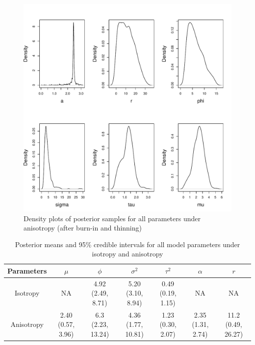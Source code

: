 \documentclass[12pt,twoside]{dukestatscithesis}
\theoremstyle{definition}
\theoremstyle{definition}
\theoremstyle{definition}
\theoremstyle{remark}
\begin{document}
\begin{figure}
\includegraphics[scale=0.7]{figure/density} \caption{Density plots of posterior samples for all parameters under anisotropy (after burn-in and thinning)}\label{fig:density}
\end{figure}
\begin{table}[H]
\centering
\setlength{\extrarowheight}{15pt}
\hspace*{-1.2cm}
\begin{tabular}{|c|c|c|c|c|c|c|}
\hline
Parameters & $\mu$ & $\phi$ & $\sigma^2$ & $\tau^2$ & $\alpha$ & $r$ \\[10pt]
\hline
Isotropy & NA & \pbox{20cm}{4.92\\(2.49, 8.71)} & \pbox{20cm}{5.20\\(3.10, 8.94)} & \pbox{20cm}{0.49\\(0.19, 1.15)} & NA & NA \\
\hline
Anisotropy & \pbox{20cm}{2.40 \\(0.57, 3.96)} & \pbox{20cm}{6.3 \\(2.23, 13.24)} & \pbox{20cm}{4.36 \\(1.77, 10.81)} & \pbox{20cm}{1.23 \\(0.30, 2.07)} & \pbox{20cm}{2.35\\(1.31, 2.74)} & \pbox{20cm}{11.2 \\(0.49, 26.27)}\\
\hline
\end{tabular}
\caption{Posterior means and 95\% credible intervals for all model parameters under isotropy and anisotropy}
\label{tab:param}
\end{table}
\end{document}
